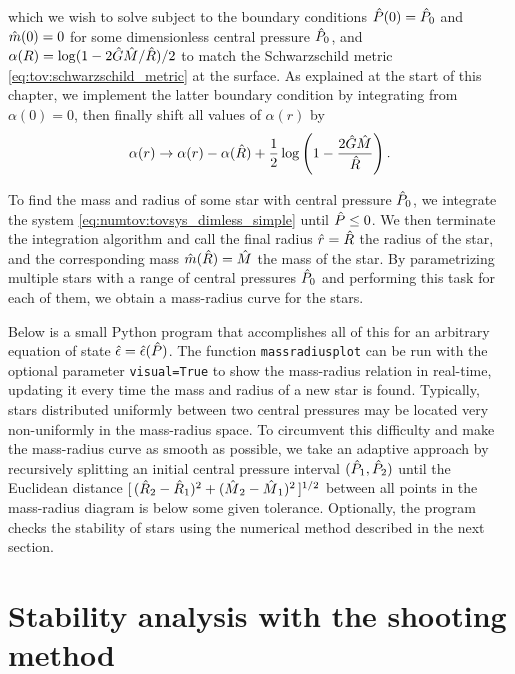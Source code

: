 which we wish to solve subject to the boundary conditions $\hat{P}(0) = \hat{P}_0$ and $\hat{m}(0) = 0$ for some dimensionless central pressure $\hat{P}_0$, and $\alpha(R) = \log ( 1 - 2 \hat{G} \hat{M} / \hat{R} ) / 2$ to match the Schwarzschild metric \eqref{eq:tov:schwarzschild_metric} at the surface.
As explained at the start of this chapter, we implement the latter boundary condition by integrating from $\alpha(0) = 0$, then finally shift all values of $\alpha(r)$ by
\begin{equation}
	\alpha(r) \rightarrow \alpha(r) - \alpha(\hat{R}) + \frac12 \log \left( 1 - \frac{2 \hat{G} \hat{M} }{ \hat{R}} \right) .
\end{equation}

To find the mass and radius of some star with central pressure $\hat{P}_0$, we integrate the system \eqref{eq:numtov:tovsys_dimless_simple} until $\hat{P} \le 0$.
We then terminate the integration algorithm and call the final radius $\hat{r} = \hat{R}$ the radius of the star, and the corresponding mass $\hat{m}(\hat{R}) = \hat{M}$ the mass of the star.
By parametrizing multiple stars with a range of central pressures $\hat{P}_0$ and performing this task for each of them, we obtain a mass-radius curve for the stars.

Below is a small Python program that accomplishes all of this for an arbitrary equation of state $\hat{\epsilon} = \hat{\epsilon}(\hat{P})$.
The function \verb|massradiusplot| can be run with the optional parameter \verb|visual=True| to show the mass-radius relation in real-time, updating it every time the mass and radius of a new star is found.
Typically, stars distributed uniformly between two central pressures may be located very non-uniformly in the mass-radius space.
To circumvent this difficulty and make the mass-radius curve as smooth as possible, we take an adaptive approach by recursively splitting an initial central pressure interval $(\hat{P}_1, \hat{P}_2)$ until the Euclidean distance $[ \, (\smash[b]{\hat{R}}_2-\smash[b]{\hat{R}}_1)^2 + (\smash[b]{\hat{M}}_2-\smash[b]{\hat{M}}_1)^2 \, ]^{1/2}$ between all points in the mass-radius diagram is below some given tolerance.
Optionally, the program checks the stability of stars using the numerical method described in the next section.


\section{Stability analysis with the shooting method}
\label{sec:numerics:shooting_method}

